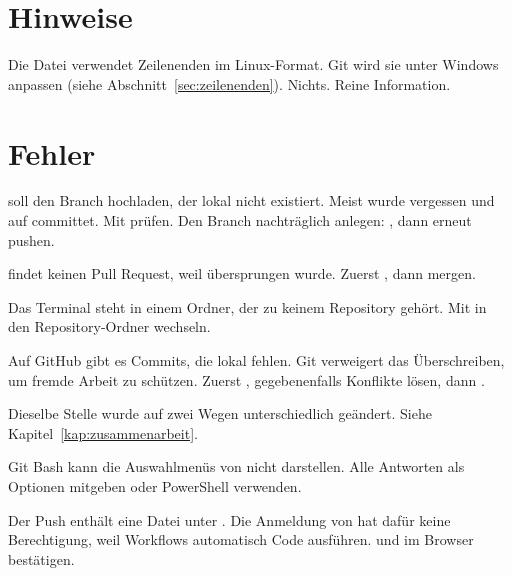 \section{Hinweise}

  {Die Datei verwendet Zeilenenden im Linux-Format. Git wird sie unter Windows anpassen
   (siehe Abschnitt~\ref{sec:zeilenenden}).}
  {Nichts. Reine Information.}

\section{Fehler}

  { soll den Branch  hochladen, der lokal nicht existiert.
   Meist wurde  vergessen und auf  committet.}
  {Mit  prüfen. Den Branch nachträglich anlegen: ,
   dann erneut pushen.}

  { findet keinen Pull Request, weil  übersprungen wurde.}
  {Zuerst , dann mergen.}

  {Das Terminal steht in einem Ordner, der zu keinem Repository gehört.}
  {Mit  in den Repository-Ordner wechseln.}

  {Auf GitHub gibt es Commits, die lokal fehlen. Git verweigert das Überschreiben, um
   fremde Arbeit zu schützen.}
  {Zuerst , gegebenenfalls Konflikte lösen, dann .}

  {Dieselbe Stelle wurde auf zwei Wegen unterschiedlich geändert.}
  {Siehe Kapitel~\ref{kap:zusammenarbeit}.}

  {Git Bash kann die Auswahlmenüs von  nicht darstellen.}
  {Alle Antworten als Optionen mitgeben oder PowerShell verwenden.}

  {Der Push enthält eine Datei unter . Die Anmeldung von 
   hat dafür keine Berechtigung, weil Workflows automatisch Code ausführen.}
  { und im Browser bestätigen.}

